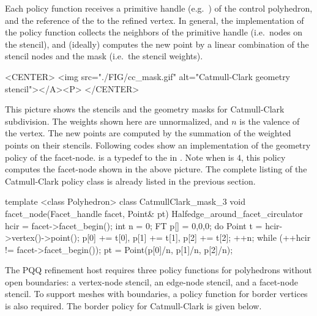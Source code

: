Each policy function receives a primitive handle 
(e.g.~) of the control polyhedron, 
and the reference of the  to the refined vertex. 
In general, the implementation of the policy function 
collects the neighbors of the primitive handle (i.e.~nodes 
on the stencil), and (ideally) computes the new point 
by a linear combination of the stencil 
nodes and the mask (i.e.~the stencil weights).

\begin{ccHtmlOnly}
  <CENTER>
     <img src="./FIG/cc_mask.gif" alt="Catmull-Clark geometry stencil"></A><P>
  </CENTER>
\end{ccHtmlOnly}

This picture shows the stencils and the geometry masks for
Catmull-Clark subdivision. The weights shown here are unnormalized, 
and $n$ is the valence of the vertex. The new points are 
computed by the summation of the weighted points on their stencils.
Following codes show an implementation of the geometry policy of 
the facet-node.  is a typedef to the 
in . Note when  is $4$, this policy computes 
the facet-node shown in the above picture. The complete listing
of the Catmull-Clark policy class is already listed in the previous
section.

\begin{ccExampleCode}
template <class Polyhedron>
class CatmullClark_mask_3 {
  void facet_node(Facet_handle facet, Point& pt) {
    Halfedge_around_facet_circulator hcir = facet->facet_begin();
    int n = 0;
    FT p[] = {0,0,0};
    do {
      Point t = hcir->vertex()->point();
      p[0] += t[0], p[1] += t[1], p[2] += t[2]; 
      ++n;
    } while (++hcir != facet->facet_begin());
    pt = Point(p[0]/n, p[1]/n, p[2]/n);
  }
}
\end{ccExampleCode}

The PQQ refinement host requires three 
policy functions for polyhedrons without open boundaries: a vertex-node 
stencil, an edge-node stencil, and a facet-node stencil. 
To support meshes with boundaries, a policy function
for border vertices is also required. The border policy for
Catmull-Clark is given below.



